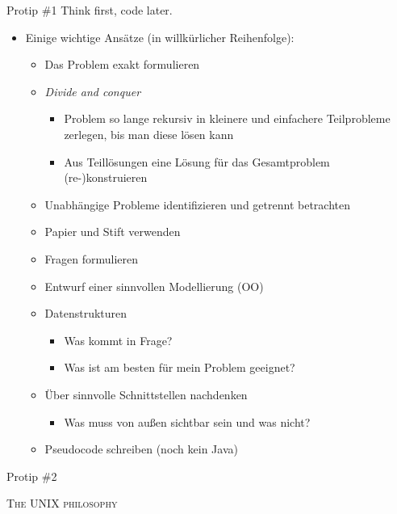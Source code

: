 \documentclass[18pt]{beamer}
\begin{document}
\begin{frame}{Protip \#1 Think first, code later.}
    \begin{itemize}
        \item Einige wichtige Ansätze (in willkürlicher Reihenfolge):
        \begin{itemize}
            \item Das Problem exakt formulieren
            \item \textit{Divide and conquer}
            \begin{itemize}
                \item Problem so lange rekursiv in kleinere und einfachere Teilprobleme zerlegen, bis man diese lösen kann
                \item Aus Teillösungen eine Lösung für das Gesamtproblem (re-)konstruieren
            \end{itemize}
            \item Unabhängige Probleme identifizieren und getrennt betrachten
            \item Papier und Stift verwenden
            \item Fragen formulieren
            \item Entwurf einer sinnvollen Modellierung (OO)
            \item Datenstrukturen
            \begin{itemize}
                \item Was kommt in Frage?
                \item Was ist am besten für mein Problem geeignet?
            \end{itemize}
            \item Über sinnvolle Schnittstellen nachdenken
            \begin{itemize}
                \item Was muss von außen sichtbar sein und was nicht?
            \end{itemize}
            \item Pseudocode schreiben (noch kein Java)
        \end{itemize}
    \end{itemize}
\end{frame}

\begin{frame}{Protip \#2}
    \begin{block}{}
        \center
        \textsc{The UNIX philosophy}
    \end{block}
\end{frame}
\end{document}
